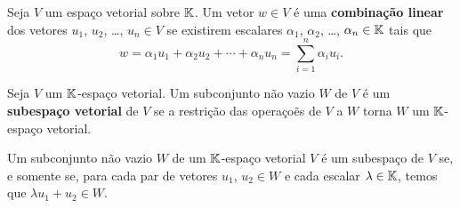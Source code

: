 \documentclass{beamer}
\begin{document}
    \begin{frame}
        \begin{definicao}
	        Seja $V$ um espa\c{c}o vetorial sobre $\mathbb{K}$.
	        Um vetor $w \in V$ \'e uma \textbf{combina\c{c}\~ao linear} dos vetores $u_1$, $u_2$, \dots, $u_n \in V$ se existirem escalares $\alpha_1$, $\alpha_2$, \dots, $\alpha_n \in \mathbb{K}$ tais que
    	    \[
	    	    w = \alpha_1 u_1 + \alpha_2u_2 + \cdots + \alpha_nu_n = \sum_{i = 1}^n \alpha_iu_i.
        	\]
        \end{definicao}
    \end{frame}

    \begin{frame}
        \begin{definicao}
        	Seja $V$ um $\mathbb{K}$-espa\c{c}o vetorial. Um subconjunto n\~ao vazio $W$ de $V$ \'e um \textbf{subespa\c{c}o vetorial} de $V$ se a restri\c{c}\~ao das opera\c{c}o\~es de $V$ a $W$ torna $W$ um $\mathbb{K}$-espa\c{c}o vetorial.
        \end{definicao}
        
        \begin{teorema}
        	Um subconjunto n\~ao vazio $W$ de um $\mathbb{K}$-espa\c{c}o vetorial $V$ \'e um subespa\c{c}o de $V$ se, e somente se, para cada par de vetores $u_1$, $u_2 \in W$ e cada escalar $\lambda \in \mathbb{K}$, temos que $\lambda u_1 + u_2 \in W$.
        \end{teorema}
    \end{frame}
\end{document}
